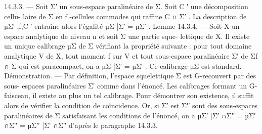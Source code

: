 \documentclass[
  10pt,
]{article}
\newenvironment{Shaded}{}{}
\newcommand{\NormalTok}[1]{#1}
\begin{document}
\begin{Shaded}
\begin{Highlighting}[]
\NormalTok{14.3.3. — Soit Σ′ un sous{-}espace paralinéaire de Σ. Soit C ′ une décomposition cellu{-}}
\NormalTok{laire de Σ en f {-}cellules commodes qui raffine C ∩ Σ′ . La description de µΣ′ ,f,C ′ entraîne}
\NormalTok{alors l’égalité µΣ |Σ′ = µΣ′ .}
\NormalTok{Lemme 14.3.4. — Soit X un espace analytique de niveau n et soit Σ une partie sque{-}}
\NormalTok{lettique de X. Il existe un unique calibrage µΣ de Σ vérifiant la propriété suivante : pour}
\NormalTok{tout domaine analytique V de X, tout moment f sur V et tout sous{-}espace paralinéaire Σ′}
\NormalTok{de Σf ∩ Σ qui est paracompact, on a µΣ |Σ′ = µΣ′ . Ce calibrage µΣ est standard.}
\NormalTok{Démonstration. — Par définition, l’espace squelettique Σ est G{-}recouvert par des sous{-}}
\NormalTok{espaces paralinéaires Σ′ comme dans l’énoncé. Les calibrages formant un G{-}faisceau, il}
\NormalTok{existe au plus un tel calibrage. Pour démontrer son existence, il suffit alors de vérifier}
\NormalTok{la condition de coïncidence. Or, si Σ′ est Σ′′ sont des sous{-}espaces paralinéaires de Σ}
\NormalTok{satisfaisant les conditions de l’énoncé, on a µΣ′ |Σ′ ∩Σ′′ = µΣ′ ∩Σ′′ = µΣ′′ |Σ′ ∩Σ′′ d’après le}
\NormalTok{paragraphe 14.3.3.}


\end{Highlighting}
\end{Shaded}
\end{document}
